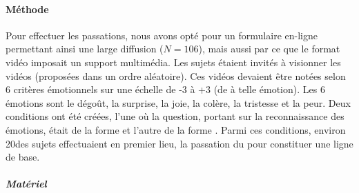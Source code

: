         \paragraph{Méthode} 
            Pour effectuer les passations, nous avons opté pour un formulaire en-ligne permettant ainsi une large diffusion ($N=106$), mais aussi par ce que le format vidéo imposait un support multimédia. 
            Les sujets étaient invités à visionner les vidéos (proposées dans un ordre aléatoire). Ces vidéos devaient être notées selon 6 critères émotionnels sur une échelle de -3 à +3 (de  à  telle émotion). Les 6 émotions sont le dégoût, la surprise, la joie, la colère, la tristesse et la peur.
            Deux conditions ont été créées, l’une où la question, portant sur la reconnaissance des émotions, était de la forme  et l’autre de la forme . Parmi ces conditions, environ 20\prc des sujets effectuaient en premier lieu, la passation du  pour constituer une ligne de base.
            \subparagraph{Matériel}
